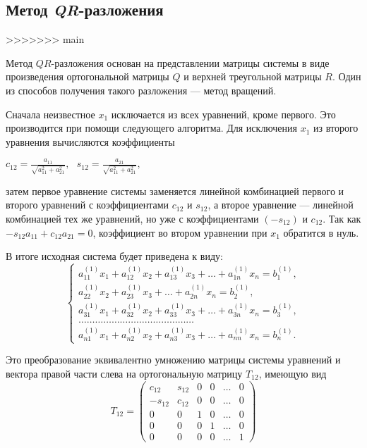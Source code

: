 \documentclass[12pt, a4paper]{article}
\def\hmath$#1${\texorpdfstring{{\rmfamily\textit{#1}}}{#1}}
\begin{document}
\subsection {Метод \hmath $QR$-разложения}
>>>>>>> main
    
    Метод $QR$-разложения основан на представлении матрицы системы в виде произведения ортогональной матрицы $Q$ и верхней треугольной матрицы $R$. Один из способов получения такого разложения --- метод вращений. 
    
    Сначала неизвестное $x_1$ исключается из всех уравнений, кроме первого. Это производится при помощи следующего алгоритма. Для исключения $x_1$ из второго уравнения вычисляются коэффициенты
    
    \begin{center}
    $c_{12}=\frac{a_{11}}{\sqrt{a_{11}^{2}+a_{21}^{2}}}, ~ ~ ~
    s_{12}=\frac{a_{21}}{\sqrt{a_{11}^{2}+a_{21}^{2}}},$
    \end{center}
    затем первое уравнение системы заменяется линейной комбинацией первого и второго уравнений с коэффициентами $c_{12}$ и $s_{12}$, а второе уравнение --- линейной комбинацией тех же уравнений, но уже с коэффициентами $(-s_{12})$ и $c_{12}$. Так как $-s_{12}a_{11} + c_{12}a_{21}=0$, коэффициент во втором уравнении при $x_1$ обратится в нуль. 
     
    В итоге исходная система будет приведена к виду: 
    \begin{equation*}
        \begin{cases}
        a_{11}^{(1)}x_{1} + a_{12}^{(1)}x_{2}+ a_{13}^{(1)}x_{3}+ \ldots + a_{1n}^{(1)}x_{n} = b_{1}^{(1)},\\
            a_{22}^{(1)}x_{2}+ a_{23}^{(1)}x_{3}+ \ldots + a_{2n}^{(1)}x_{n} = b_{2}^{(1)},\\
            a_{31}^{(1)}x_{1} + a_{32}^{(1)}x_{2}+ a_{33}^{(1)}x_{3}+ \ldots + a_{3n}^{(1)}x_{n} = b_{3}^{(1)},\\
            \ldots\ldots\ldots\ldots\ldots\ldots\ldots\ldots\ldots\ldots\ldots\ldots\ldots\ldots \\
                a_{n1}^{(1)}x_{1} + a_{n2}^{(1)}x_{2}+ a_{n3}^{(1)}x_{3}+ \ldots + a_{nn}^{(1)}x_{n} = b_{n}^{(1)}.
        \end{cases}
    \end{equation*}

Это преобразование эквивалентно умножению матрицы системы уравнений и вектора правой части слева на ортогональную матрицу $T_{12}$, имеющую вид \\ 
\[
T_{12}=
\begin{pmatrix}
c_{12} & s_{12} & 0 & 0 & \ldots & 0 \\
-s_{12} & c_{12} & 0 & 0 & \ldots & 0 \\
0 & 0 & 1 & 0 & \ldots & 0 \\
0 & 0 & 0 & 1 & \ldots & 0 \\
0 & 0 & 0 & 0 & \ldots & 1
\end{pmatrix}
\]
\end{document}
